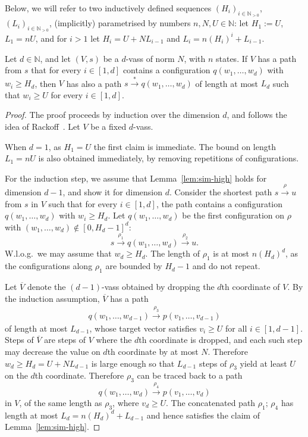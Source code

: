 \documentclass[a4paper, UKenglish, cleveref, autoref, thm-restate]{lipics-v2021}
\newcommand{\N}{\mathbb{N}}
\newcommand{\trans}[1]{\stackrel{#1}{\longrightarrow}}
\newcommand{\tran}{\trans{*}}
\newcommand{\vass}{{\sc vass}\xspace}
\newcommand{\parvass}[1]{{$#1$-\vass}\xspace}
\newcommand{\setfromto}[2]{[#1, #2]}
\newcommand{\setto}[1]{\setfromto 1 {#1}}
\newcommand{\Wlog}{W.l.o.g.~}
\newcommand{\Npos}{\N_{>0}}
\newcommand{\essdvass}[1]{\overline{#1}}
\begin{document}
\begin{appendixproof}
Below, we will refer to two inductively defined sequences $(H_i)_{i\in\Npos}$, $(L_i)_{i\in\Npos}$,
(implicitly) parametrised
by numbers $n, N, U \in \N$:
let $H_1 := U$, $L_1 = n U$, and for  $i > 1$ let $H_i = U + N L_{i-1}$ and  
$L_i = n (H_i)^i + L_{i-1}$.

\begin{lemma}\label{lem:sim-high}
Let $d \in \N$, and let $(V, s)$ be a \parvass d of norm $N$, with $n$ states.
If $V$ has a path from $s$ that for every $i\in\setto d$ contains a configuration 
$q(w_1, \ldots, w_d)$ with $w_i \geq H_d$,
then $V$ has also a path $s \tran q(w_1, \ldots, w_d)$ of length at most $L_d$
such that $w_i \geq U$ for every $i\in\setto d$.
\end{lemma}


\begin{proof}The proof proceeds by induction over the dimension $d$, and 
follows the idea of Rackoff~\cite[Lemma 3.4]{DBLP:journals/tcs/Rackoff78}.
Let $V$ be a fixed \parvass d.

When $d = 1$, as $H_1 = U$ the first claim is immediate.
The bound on length $L_1 = n U$ is also obtained immediately, by removing repetitions of
configurations.

For the induction step, we assume that Lemma~\ref{lem:sim-high} holds for dimension $d-1$,
and show it for dimension $d$.
Consider the  shortest 
path $s\trans{\rho} u$ from $s$ in $V$ such that for every $i\in\setto d$, the path contains a configuration 
$q(w_{1}, \ldots, w_{d})$ with $w_{i} \geq H_d$.
Let $q(w_1, \ldots, w_d)$ be the first  configuration  on $\rho$ with
$(w_1, \ldots, w_d) \notin {\setfromto 0 {H_d-1}}^d$:
\[
s \trans {\rho_1} q(w_1, \ldots, w_d) \trans{\rho_2} u.
\]
\Wlog we may assume that $w_d \geq H_d$. 
The length of $\rho_1$ is at most $n (H_d)^d$, as the 
configurations along $\rho_1$ are bounded by $H_d -1$ and do not repeat.

Let $\essdvass V$ denote the \parvass {(d-1)} obtained by dropping the $d$th coordinate of $V$.
By the induction assumption, $\essdvass V$ has a path 
\begin{align*}q(w_1, \ldots, w_{d-1}) \trans{\rho_3} p(v_1, \ldots, v_{d-1})
\end{align*}
of length at most $L_{d-1}$, whose target vector satisfies $v_i \geq U$ for all $i\in\setto {d-1}$.
Steps of $\essdvass V$ are steps of $V$ where the $d$th coordinate is dropped,
and each such step may decrease the value on $d$th coordinate by at most $N$.
Therefore $w_d\geq H_d=U+N L_{d-1}$ is large enough so that $L_{d-1}$ steps of 
$\rho_3$ yield at least $U$ on the $d$th coordinate.
Therefore $\rho_3$  can be traced back to a path 
\[
q(w_1, \ldots, w_{d}) \trans{\rho_4} p(v_1, \ldots, v_{d})
\]
in $V$, of the same length as $\rho_3$, where $v_d\geq U$.
The concatenated path $\rho_1; \, \rho_4$ has length at most
$L_d = n (H_d)^d + L_{d-1}$ and hence satisfies the claim of Lemma~\ref{lem:sim-high}.
\end{proof}


\end{appendixproof}
\end{document}
